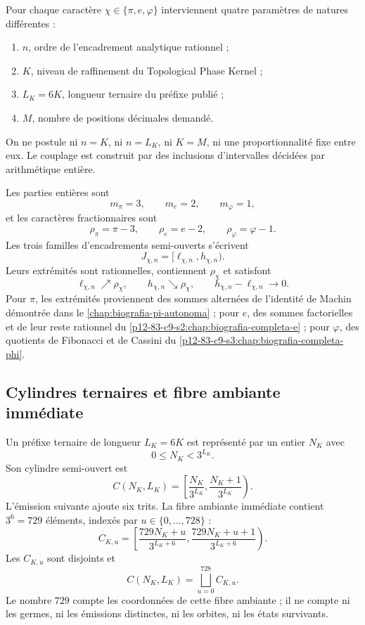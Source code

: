 Pour chaque caractère \(\chi\in\{\pi,e,\varphi\}\) interviennent quatre
paramètres de natures différentes :
\begin{enumerate}
 \item \(n\), ordre de l’encadrement analytique rationnel ;
 \item \(K\), niveau de raffinement du Topological Phase Kernel ;
 \item \(L_K=6K\), longueur ternaire du préfixe publié ;
 \item \(M\), nombre de positions décimales demandé.
\end{enumerate}
On ne postule ni \(n=K\), ni \(n=L_K\), ni \(K=M\), ni une proportionnalité fixe
entre eux. Le couplage est construit par des inclusions d’intervalles
décidées par arithmétique entière.

Les parties entières sont
\[
 m_\pi=3,
 \qquad
 m_e=2,
 \qquad
 m_\varphi=1,
\]
et les caractères fractionnaires sont
\[
 \rho_\pi=\pi-3,
 \qquad
 \rho_e=e-2,
 \qquad
 \rho_\varphi=\varphi-1.
\]
Les trois familles d’encadrements semi-ouverts s’écrivent
\[
 J_{\chi,n}=[\ell_{\chi,n},h_{\chi,n}).
\]
Leurs extrémités sont rationnelles, contiennent \(\rho_\chi\) et satisfont
\[
 \ell_{\chi,n}\nearrow\rho_\chi,
 \qquad
 h_{\chi,n}\searrow\rho_\chi,
 \qquad
 h_{\chi,n}-\ell_{\chi,n}\longrightarrow0.
\]
Pour \(\pi\), les extrémités proviennent des sommes alternées de l’identité
de Machin démontrée dans le \cref{chap:biografia-pi-autonoma} ; pour \(e\),
des sommes factorielles et de leur reste rationnel du
\cref{p12-83-c9-s2:chap:biografia-completa-e} ; pour \(\varphi\), des quotients de
Fibonacci et de Cassini du \cref{p12-83-c9-s3:chap:biografia-completa-phi}.

\subsection{Cylindres ternaires et fibre ambiante immédiate}

Un préfixe ternaire de longueur \(L_K=6K\) est représenté par un entier
\(N_K\) avec
\[
 0\leq N_K<3^{L_K}.
\]
Son cylindre semi-ouvert est
\begin{equation}
 C(N_K,L_K)=
 \left[
 \frac{N_K}{3^{L_K}},
 \frac{N_K+1}{3^{L_K}}
 \right).
 \label{p12-83-c9-s4:eq:cilindro-nivel-K}
\end{equation}
L’émission suivante ajoute six trits. La fibre ambiante immédiate contient
\(3^6=729\) éléments, indexés par \(u\in\{0,\ldots,728\}\) :
\begin{equation}
 C_{K,u}=
 \left[
 \frac{729N_K+u}{3^{L_K+6}},
 \frac{729N_K+u+1}{3^{L_K+6}}
 \right).
 \label{p12-83-c9-s4:eq:729-subcilindros}
\end{equation}
Les \(C_{K,u}\) sont disjoints et
\[
 C(N_K,L_K)=\bigsqcup_{u=0}^{728}C_{K,u}.
\]
Le nombre \(729\) compte les coordonnées de cette fibre ambiante ; il ne compte
ni les germes, ni les émissions distinctes, ni les orbites, ni les états survivants.

